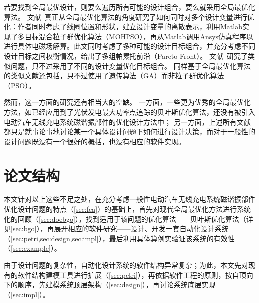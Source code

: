 \documentclass[index]{subfiles}
\begin{document}
若要找到全局最优设计，则要么遍历所有可能的设计组合，要么就采用全局最优化算法。
文献~真正从全局最优化算法的角度研究了如何同时对多个设计变量进行优化：作者同时考虑了线圈位置和形状，建立设计变量的离散表示，利用Matlab实现了多目标混合粒子群优化算法（MOHPSO），再从Matlab调用Ansys仿真程序以进行具体电磁场解算。此文同时考虑了多种可能的设计目标组合，并充分考虑不同设计目标之间权衡情况，给出了多组帕累托前沿（Pareto Front）。
文献~研究了类似问题，只不过采用了不同的设计变量优化目标组合。
同样基于全局最优化算法的类似文献还包括，只不过使用了遗传算法（GA）而非粒子群优化算法（PSO）。

然而，这一方面的研究还有相当大的空缺。
一方面，一些更为优秀的全局最优化方法，如已经应用到了光伏发电最大功率点追踪\cite{abdelrahman2016}的贝叶斯优化算法，还没有被引入电动汽车无线充电系统磁谐振部件的优化设计方法中；
另一方面，上述所有文献都只是就事论事地讨论某一个具体设计问题下如何进行设计决策，而对于一般性的设计问题既没有一个很好的概括，也没有相应的软件实现。

\section{论文结构}
本文针对以上这些不足之处，在充分考虑一般性电动汽车无线充电系统磁谐振部件优化设计问题的特点（\cref{sec:fea}）的基础上，首先对现代全局最优化方法进行系统化的回顾（\cref{sec:doebgo}），找到适用于该问题的优化算法——贝叶斯优化算法（详见\cref{sec:bgo}），再展开相应的软件研究——设计、开发一套自动化设计系统（\cref{sec:petri,sec:design,sec:impl}），最后利用具体算例实验证该系统的有效性（\cref{sec:example}）。

由于设计问题的复杂性，自动化设计系统的软件结构异常复杂；为此，本文先对现有的软件结构建模工具进行扩展（\cref{sec:petri}），再依据软件工程的原则，按自顶向下的顺序，先建模系统顶层架构（\cref{sec:design}），再讨论系统底层实现（\cref{sec:impl}）。
\end{document}
